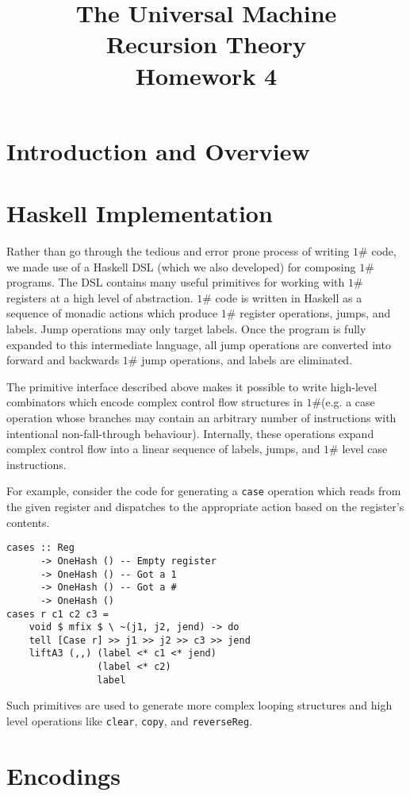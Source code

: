 \documentclass[10pt, preprint, nocopyrightspace]{sigplanconf}
\title{The Universal \oh Machine\\\large Recursion Theory\\ Homework 4}
\newcommand{\oh}{$1\#$\xspace}
\begin{document}
\maketitle

\section{Introduction and Overview}

\section{Haskell Implementation}

Rather than go through the tedious and error prone process of writing \oh code,
we made use of a Haskell DSL (which we also developed) for composing \oh
programs.
The DSL contains many useful primitives for working with \oh registers at a high
level of abstraction.
\oh code is written in Haskell as a sequence of monadic actions which produce
\oh register operations, jumps, and labels.
Jump operations may only target labels.
Once the program is fully expanded to this intermediate language, all jump
operations are converted into forward and backwards \oh jump operations, and
labels are eliminated.

The primitive interface described above makes it possible to write high-level
combinators which encode complex control flow structures in \oh (e.g. a case
operation whose branches may contain an arbitrary number of instructions with
intentional non-fall-through behaviour).
Internally, these operations expand complex control flow into a linear sequence
of labels, jumps, and \oh level case instructions.

For example, consider the code for generating a \texttt{case} operation which
reads from the given register and dispatches to the appropriate action based
on the register's contents.
\begin{lstlisting}
cases :: Reg
      -> OneHash () -- Empty register
      -> OneHash () -- Got a 1
      -> OneHash () -- Got a #
      -> OneHash ()
cases r c1 c2 c3 =
    void $ mfix $ \ ~(j1, j2, jend) -> do
    tell [Case r] >> j1 >> j2 >> c3 >> jend
    liftA3 (,,) (label <* c1 <* jend)
                (label <* c2)
                label
\end{lstlisting}
Such primitives are used to generate more complex looping structures and high level
operations like \texttt{clear}, \texttt{copy}, and \texttt{reverseReg}.

\section{Encodings}
\end{document}
